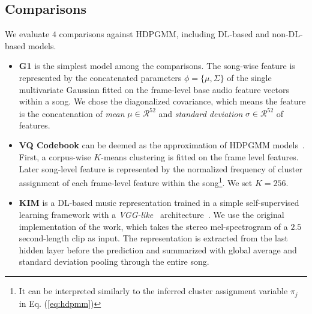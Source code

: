 \documentclass{article}
\begin{document}
\subsection{Comparisons}\label{sec:experimental_setup:comparisons}

We evaluate $4$ comparisons against HDPGMM, including DL-based and non-DL-based models.

\begin{itemize}[noitemsep, leftmargin=*]
    \item \textbf{G1} is the simplest model among the comparisons. The song-wise feature is represented by the concatenated parameters $\phi = \{\mu, \Sigma\}$ of the single multivariate Gaussian fitted on the frame-level base audio feature vectors within a song. We chose the diagonalized covariance, which means the feature is the concatenation of \emph{mean} $\mu\in\mathcal{R}^{52}$ and \emph{standard deviation} $\sigma\in\mathcal{R}^{52}$ of features.

    \item \textbf{VQ Codebook} can be deemed as the approximation of HDPGMM models~\cite{DBLP:conf/ismir/HoffmanBC08}. First, a corpus-wise $K$-means clustering is fitted on the frame level features. Later song-level feature is represented by the normalized frequency of cluster assignment of each frame-level feature within the song\footnote{It can be interpreted similarly to the inferred cluster assignment variable $\pi_{j}$ in Eq. (\ref{eq:hdpmm})}. We set $K=256$.

    \item \textbf{KIM} is a DL-based music representation trained in a simple self-supervised learning framework with a \emph{VGG-like}~\cite{DBLP:journals/corr/SimonyanZ14a} architecture~\cite{DBLP:journals/nca/KimULH20}.
    We use the original implementation of the work, which takes the stereo mel-spectrogram of a $2.5$ second-length clip as input. The representation is extracted from the last hidden layer before the prediction and summarized with global average and standard deviation pooling through the entire song.


\end{itemize}
\end{document}
